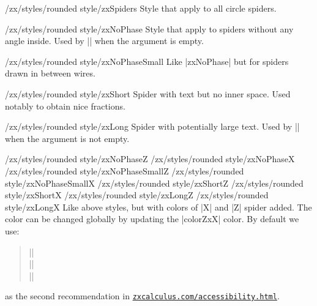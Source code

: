 \documentclass[a4paper]{ltxdoc}
\begin{document}
{\begin{stylekey}{/zx/styles/rounded style/zxSpiders}
  Style that apply to all circle spiders.
\end{stylekey}

\begin{stylekey}{/zx/styles/rounded style/zxNoPhase}
  Style that apply to spiders without any angle inside. Used by |\zxX{}| when the argument is empty.
\end{stylekey}

\begin{stylekey}{/zx/styles/rounded style/zxNoPhaseSmall}
  Like |zxNoPhase| but for spiders drawn in between wires.
\end{stylekey}

\begin{stylekey}{/zx/styles/rounded style/zxShort}
  Spider with text but no inner space. Used notably to obtain nice fractions.
\end{stylekey}

\begin{stylekey}{/zx/styles/rounded style/zxLong}
  Spider with potentially large text. Used by |\zxX{\alpha}| when the argument is not empty.
\end{stylekey}

\begin{pgfmanualentry}
  \makeatletter
  \def\extrakeytext{style, }
  \extractkey/zx/styles/rounded style/zxNoPhaseZ\@nil%
  \extractkey/zx/styles/rounded style/zxNoPhaseX\@nil%
  \extractkey/zx/styles/rounded style/zxNoPhaseSmallZ\@nil%
  \extractkey/zx/styles/rounded style/zxNoPhaseSmallX\@nil%
  \extractkey/zx/styles/rounded style/zxShortZ\@nil%
  \extractkey/zx/styles/rounded style/zxShortX\@nil%
  \extractkey/zx/styles/rounded style/zxLongZ\@nil%
  \extractkey/zx/styles/rounded style/zxLongX\@nil%
  \makeatother
  \pgfmanualbody
  Like above styles, but with colors of |X| and |Z| spider added. The color can be changed globally by updating the |colorZxX| color. By default we use:
  \begin{verse}
    ||\\
    ||\\
    ||
  \end{verse}
  as the second recommendation in \href{https://zxcalculus.com/accessibility.html}{\texttt{zxcalculus.com/accessibility.html}}.
\end{pgfmanualentry}

}
\end{document}
